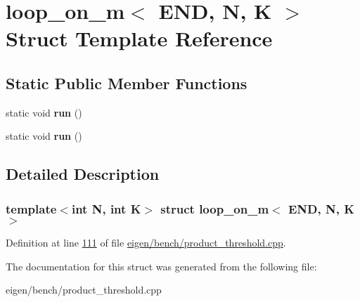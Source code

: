 \hypertarget{structloop__on__m_3_01_e_n_d_00_01_n_00_01_k_01_4}{}\section{loop\+\_\+on\+\_\+m$<$ E\+ND, N, K $>$ Struct Template Reference}
\label{structloop__on__m_3_01_e_n_d_00_01_n_00_01_k_01_4}
\subsection*{Static Public Member Functions}
\begin{DoxyCompactItemize}
\item 
\mbox{\label{structloop__on__m_3_01_e_n_d_00_01_n_00_01_k_01_4_af12a3987c181ac15fd004026c295b1be}} 
static void {\bfseries run} ()
\item 
\mbox{\label{structloop__on__m_3_01_e_n_d_00_01_n_00_01_k_01_4_af12a3987c181ac15fd004026c295b1be}} 
static void {\bfseries run} ()
\end{DoxyCompactItemize}


\subsection{Detailed Description}
\subsubsection*{template$<$int N, int K$>$\newline
struct loop\+\_\+on\+\_\+m$<$ E\+N\+D, N, K $>$}



Definition at line \hyperlink{eigen_2bench_2product__threshold_8cpp_source_l00111}{111} of file \hyperlink{eigen_2bench_2product__threshold_8cpp_source}{eigen/bench/product\+\_\+threshold.\+cpp}.



The documentation for this struct was generated from the following file\+:\begin{DoxyCompactItemize}
\item 
eigen/bench/product\+\_\+threshold.\+cpp\end{DoxyCompactItemize}
